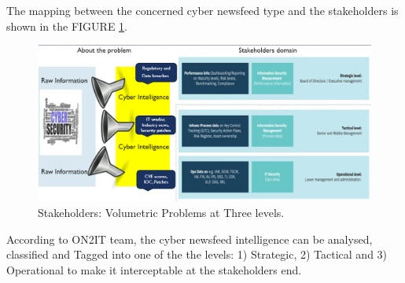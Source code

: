 The mapping between the concerned cyber newsfeed type and the stakeholders is shown in the FIGURE \ref{fig:stakeholder-problem}.

\begin{figure}[ht]
    \centering
     
    \includegraphics[width=1\linewidth]{Figures/stakeholder-problem}
     
    \caption{Stakeholders: Volumetric Problems at Three levels.
    \label{fig:stakeholder-problem}}
  
\end{figure}

According to ON2IT team, the cyber newsfeed intelligence can be analysed, classified and Tagged into one of the the levels: 1) Strategic, 2) Tactical and 3) Operational to make it interceptable at the stakeholders end. 



\begin{table}[hbt!]
    \caption{Cyber Information needs per level}
    \label{tab:stakeholder-news}
    \centering
\end{table}

